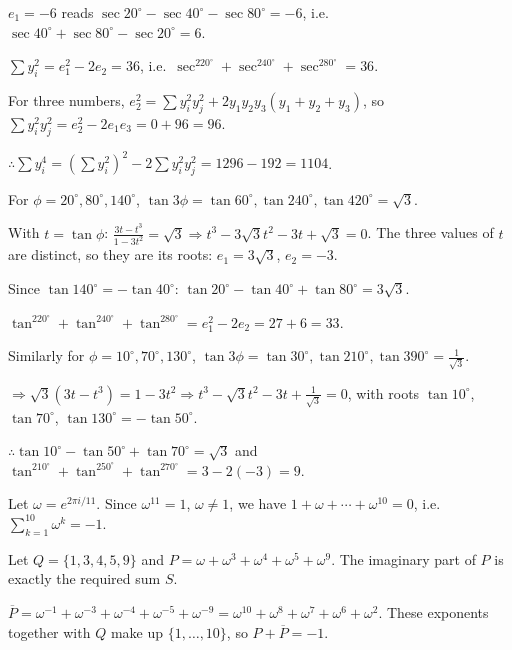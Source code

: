   $e_1 = -6$ reads $\sec20^\circ - \sec40^\circ - \sec80^\circ = -6$, i.e.\ $\sec40^\circ + \sec80^\circ - \sec20^\circ
  = 6$.

  $\displaystyle\sum y_i^2 = e_1^2 - 2e_2 = 36$, i.e.\ $\sec^220^\circ + \sec^240^\circ + \sec^280^\circ = 36$.

  For three numbers, $e_2^2 = \sum y_i^2y_j^2 + 2y_1y_2y_3(y_1 + y_2 + y_3)$, so $\sum y_i^2y_j^2 = e_2^2 - 2e_1e_3
  = 0 + 96 = 96$.

  $\therefore \displaystyle\sum y_i^4 = \left(\sum y_i^2\right)^2 - 2\sum y_i^2y_j^2 = 1296 - 192 = 1104$.
\item For $\phi = 20^\circ, 80^\circ, 140^\circ$, $\tan3\phi = \tan60^\circ, \tan240^\circ, \tan420^\circ = \sqrt{3}$.

  With $t = \tan\phi$: $\frac{3t - t^3}{1 - 3t^2} = \sqrt{3}\Rightarrow t^3 - 3\sqrt{3}t^2 - 3t + \sqrt{3} = 0$.
  The three values of $t$ are distinct, so they are its roots: $e_1 = 3\sqrt{3}$, $e_2 = -3$.

  Since $\tan140^\circ = -\tan40^\circ$: $\tan20^\circ - \tan40^\circ + \tan80^\circ = 3\sqrt{3}$.

  $\tan^220^\circ + \tan^240^\circ + \tan^280^\circ = e_1^2 - 2e_2 = 27 + 6 = 33$.

  Similarly for $\phi = 10^\circ, 70^\circ, 130^\circ$, $\tan3\phi = \tan30^\circ, \tan210^\circ, \tan390^\circ
  = \frac{1}{\sqrt{3}}$.

  $\Rightarrow \sqrt{3}(3t - t^3) = 1 - 3t^2\Rightarrow t^3 - \sqrt{3}t^2 - 3t + \frac{1}{\sqrt{3}} = 0$, with roots
  $\tan10^\circ$, $\tan70^\circ$, $\tan130^\circ = -\tan50^\circ$.

  $\therefore \tan10^\circ - \tan50^\circ + \tan70^\circ = \sqrt{3}$ and $\tan^210^\circ + \tan^250^\circ
  + \tan^270^\circ = 3 - 2(-3) = 9$.
\item Let $\omega = e^{2\pi i/11}$. Since $\omega^{11} = 1$, $\omega\neq 1$, we have $1 + \omega + \cdots +
  \omega^{10} = 0$, i.e.\ $\displaystyle\sum_{k = 1}^{10}\omega^k = -1$.

  Let $Q = \{1, 3, 4, 5, 9\}$ and $P = \omega + \omega^3 + \omega^4 + \omega^5 + \omega^9$. The imaginary part of
  $P$ is exactly the required sum $S$.

  $\overline{P} = \omega^{-1} + \omega^{-3} + \omega^{-4} + \omega^{-5} + \omega^{-9} = \omega^{10} + \omega^8 +
  \omega^7 + \omega^6 + \omega^2$. These exponents together with $Q$ make up $\{1, \ldots, 10\}$, so $P +
  \overline{P} = -1$.

